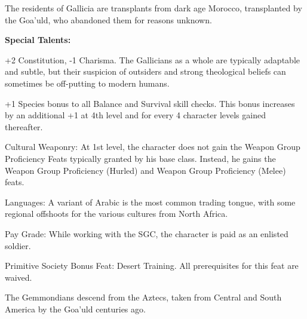The residents of Gallicia are transplants from dark age Morocco, transplanted by the Goa’uld, who abandoned them for reasons unknown.

\textbf{Special Talents:}
\begin{itemize*}
\item +2 Constitution, -1 Charisma. The Gallicians as a whole are typically adaptable and subtle, but their suspicion of outsiders and strong theological beliefs can sometimes be off-putting to modern humans.
\item +1 Species bonus to all Balance and Survival skill checks. This bonus increases by an additional +1 at 4th level and for every 4 character levels gained thereafter.
\item Cultural Weaponry: At 1st level, the character does not gain the Weapon Group Proficiency Feats typically granted by his base class. Instead, he gains the Weapon Group Proficiency (Hurled) and Weapon Group Proficiency (Melee) feats.
\item Languages: A variant of Arabic is the most common trading tongue, with some regional offshoots for the various cultures from North Africa.
\item Pay Grade: While working with the SGC, the character is paid as an enlisted soldier.
\item Primitive Society Bonus Feat: Desert Training. All prerequisites for this feat are waived.
\end{itemize*}


The Gemmondians descend from the Aztecs, taken from Central and South America by the Goa'uld centuries ago.

